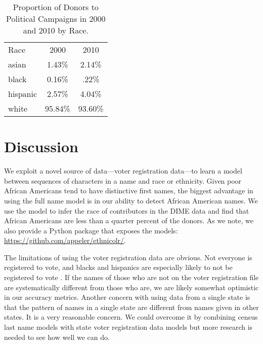 \documentclass[12pt, letterpaper]{article}
\begin{document}
\begin{table}[h!]
\centering
\caption{Proportion of Donors to Political Campaigns in 2000 and 2010 by Race.}
\begin{tabular}{ l c  c}
\hline	
Race & 2000  & 2010 \\	
asian & 	1.43\%  & 2.14\%\\
black & 	0.16\%  & .22\%\\
hispanic & 	2.57\%  & 4.04\%\\
white & 	95.84\%  & 93.60\%\\
\hline
\end{tabular}
\label{table:percentage_contrib_by_race}
\end{table}

\section*{Discussion}
We exploit a novel source of data---voter registration data---to learn a model between sequences of characters in a name and race or ethnicity. Given poor African Americans tend to have distinctive first names, the biggest advantage in using the full name model is in our ability to detect African American names. We use the model to infer the race of contributors in the DIME data and find that African Americans are less than a quarter percent of the donors. As we note, we also provide a Python package that exposes the models: \url{https://github.com/appeler/ethnicolr/}.

The limitations of using the voter registration data are obvious. Not everyone is registered to vote, and blacks and hispanics are especially likely to not be registered to vote \citep{ansolabehere2011gender}. If the names of those who are not on the voter registration file are systematically different from those who are, we are likely somewhat optimistic in our accuracy metrics. Another concern with using data from a single state is that the pattern of names in a single state are different from names given in other states. It is a very reasonable concern. We could overcome it by combining census last name models with state voter registration data models but more research is needed to see how well we can do.

\clearpage


\end{document}
